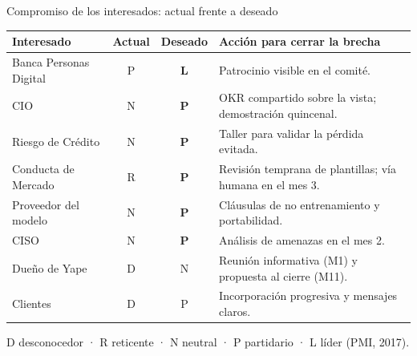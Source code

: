 \documentclass[aspectratio=169,11pt]{beamer}
\begin{document}
\begin{frame}{Compromiso de los interesados: actual frente a deseado}
\vspace{0.02cm}
\begin{center}
\footnotesize
\begin{tabular}{p{3.3cm}ccp{7.3cm}}
\toprule
\textbf{Interesado} & \textbf{Actual} & \textbf{Deseado} & \textbf{Acción para cerrar la brecha} \\
\midrule
Banca Personas Digital & P & \textbf{L} & Patrocinio visible en el comité. \\
CIO & N & \textbf{P} & OKR compartido sobre la vista; demostración quincenal. \\
Riesgo de Crédito & N & \textbf{P} & Taller para validar la pérdida evitada. \\
Conducta de Mercado & R & \textbf{P} & Revisión temprana de plantillas; vía humana en el mes 3. \\
Proveedor del modelo & N & \textbf{P} & Cláusulas de no entrenamiento y portabilidad. \\
CISO & N & \textbf{P} & Análisis de amenazas en el mes 2. \\
Dueño de Yape & D & N & Reunión informativa (M1) y propuesta al cierre (M11). \\
Clientes & D & P & Incorporación progresiva y mensajes claros. \\
\bottomrule
\end{tabular}
\end{center}
\vspace{0.15cm}
{\footnotesize\color{muted} D desconocedor · R reticente · N neutral · P partidario · L líder (PMI, 2017).}
\end{frame}
\end{document}
